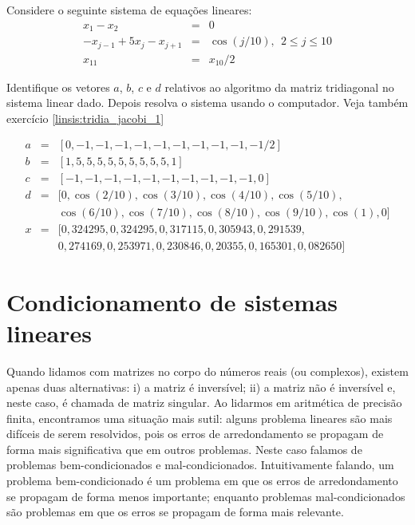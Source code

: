 \begin{exer}\label{linsis:tridia_jacobi_2} Considere o seguinte sistema de equações lineares:
\begin{eqnarray}
x_1-x_2&=&0\nonumber\\
-x_{j-1}+5x_j-x_{j+1}&=&\cos(j/10),~~ 2\leq j \leq 10\nonumber\\
x_{11}&=&x_{10}/2
\end{eqnarray}

Identifique os vetores $a$, $b$, $c$ e $d$  relativos ao algoritmo da matriz tridiagonal no sistema linear dado.  Depois resolva o sistema usando o computador. Veja também exercício \ref{linsis:tridia_jacobi_1}
 \end{exer}
\begin{resp}
 \begin{eqnarray*}
  a&=&[0, -1, -1, -1, -1, -1, -1, -1, -1, -1, -1/2]\\ 
  b&=&[1,  5,  5,  5,  5,  5,  5,  5,  5,  5,  1  ]\\
  c&=&[-1, -1, -1, -1, -1, -1, -1, -1, -1, -1, 0  ]\\ 
  d&=&[0, \cos(2/10), \cos(3/10), \cos(4/10), \cos(5/10),\\&& \cos(6/10), \cos(7/10), \cos(8/10), \cos(9/10), \cos(1) ,0]\\
  x&=&[0,324295, 0,324295, 0,317115, 0,305943, 0,291539,\\&& 0,274169, 0,253971, 0,230846, 0,20355, 0,165301, 0,082650]
 \end{eqnarray*}
\end{resp}



\section{Condicionamento de sistemas lineares}

Quando lidamos com matrizes no corpo do números reais (ou complexos), existem apenas duas alternativas: i) a matriz é inversível; ii) a matriz não é inversível e, neste caso, é chamada de matriz singular. Ao lidarmos em aritmética de precisão finita, encontramos uma situação mais sutil: alguns problema lineares são mais difíceis de serem resolvidos, pois os erros de arredondamento se propagam de forma mais significativa que em outros problemas. Neste caso falamos de problemas bem-condicionados e mal-condicionados. Intuitivamente falando, um problema bem-condicionado é um problema em que os erros de arredondamento se propagam de forma menos importante; enquanto problemas mal-condicionados são problemas em que os erros se propagam de forma mais relevante.

